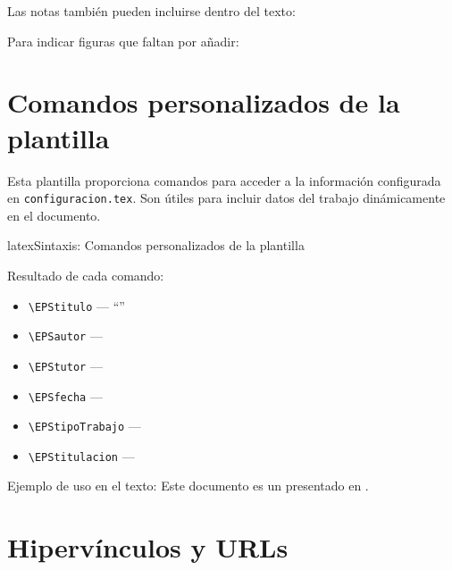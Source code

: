 
Las notas también pueden incluirse dentro del texto:


Para indicar figuras que faltan por añadir:


\section{Comandos personalizados de la plantilla}
\label{sec:comandos-eps}

Esta plantilla proporciona comandos para acceder a la información configurada
en \texttt{configuracion.tex}. Son útiles para incluir datos del trabajo
dinámicamente en el documento.

\begin{codigosimple}{latex}{Sintaxis: Comandos personalizados de la plantilla}
\EPStitulo      %
\EPSautor       %
\EPStutor       %
\EPSfecha       %
\EPStipoTrabajo %
\EPStitulacion  %
\end{codigosimple}

Resultado de cada comando:

\begin{itemize}
  \item \verb|\EPStitulo| --- ``\EPStitulo''
  \item \verb|\EPSautor| --- \EPSautor
  \item \verb|\EPStutor| --- \EPStutor
  \item \verb|\EPSfecha| --- \EPSfecha
  \item \verb|\EPStipoTrabajo| --- \EPStipoTrabajo
  \item \verb|\EPStitulacion| --- \EPStitulacion
\end{itemize}

Ejemplo de uso en el texto: Este documento es un \EPStipoTrabajo{} presentado en \EPSfecha.

\section{Hipervínculos y URLs}
\label{sec:hipervinculos}

